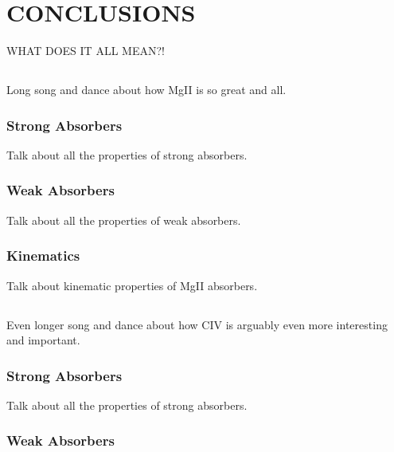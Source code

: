 \section{\MakeUppercase{Conclusions}}
\label{ch8}

WHAT DOES IT ALL MEAN?!

\subsection{{\MgII}}
\label{ch8:MgII}

Long song and dance about how MgII is so great and all.

\subsubsection{Strong Absorbers}
\label{ch8:MgIIstrong}

Talk about all the properties of strong absorbers.

\subsubsection{Weak Absorbers}
\label{ch8:MgIIweak}

Talk about all the properties of weak absorbers.

\subsubsection{Kinematics}
\label{ch8:MgIIkinematics}

Talk about kinematic properties of MgII absorbers.

\subsection{{\CIV}}
\label{ch8:CIV}

Even longer song and dance about how CIV is arguably even more interesting and important.

\subsubsection{Strong Absorbers}
\label{ch8:CIVstrong}

Talk about all the properties of strong absorbers.

\subsubsection{Weak Absorbers}
\label{ch8:CIVweak}

